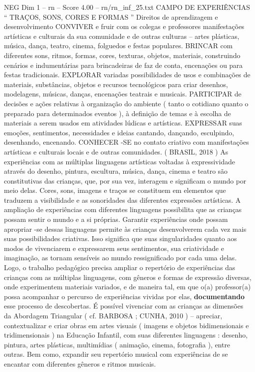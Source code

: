 \begin{textsample}{NEG Dim 1 – rn – Score 4.00 – rn/rn\_inf\_25.txt}  \label{ex:f1_neg_030}
CAMPO DE EXPERIÊNCIAS “ TRAÇOS, SONS, CORES E FORMAS ” Direitos de aprendizagem e desenvolvimento CONVIVER e fruir com os colegas e professores manifestações artísticas e culturais da sua comunidade e de outras culturas – artes plásticas, música, dança, teatro, cinema, folguedos e festas populares.
BRINCAR com diferentes sons, ritmos, formas, cores, texturas, objetos, materiais, construindo cenários e indumentárias para brincadeiras de faz de conta, encenações ou para festas tradicionais.
EXPLORAR variadas possibilidades de usos e combinações de materiais, substâncias, objetos e recursos tecnológicos para criar desenhos, modelagens, músicas, danças, encenações teatrais e musicais.
PARTICIPAR de decisões e ações relativas à organização do ambiente ( tanto o cotidiano quanto o preparado para determinados eventos ), à definição de temas e à escolha de materiais a serem usados em atividades lúdicas e artísticas.
EXPRESSAR suas emoções, sentimentos, necessidades e ideias cantando, dançando, esculpindo, desenhando, encenando.
CONHECER -SE no contato criativo com manifestações artísticas e culturais locais e de outras comunidades. ( BRASIL, 2018 ) As experiências com as múltiplas linguagens artísticas voltadas à expressividade através do desenho, pintura, escultura, música, dança, cinema e teatro são constitutivas das crianças, que, por sua vez, interagem e significam o mundo por meio delas.
Cores, sons, imagens e traços se constituem em elementos que traduzem a visibilidade e as sonoridades das diferentes expressões artísticas.
A ampliação de experiências com diferentes linguagens possibilita que as crianças possam sentir o mundo e a si próprias.
Garantir experiências onde possam apropriar -se dessas linguagens permite às crianças desenvolverem cada vez mais suas possibilidades criativas.
Isso significa que suas singularidades quanto aos modos de vivenciarem e expressarem seus sentimentos, sua criatividade e imaginação, as tornam sensíveis ao mundo ressignificado por cada uma delas.
Logo, o trabalho pedagógico precisa ampliar o repertório de experiências das crianças com as múltiplas linguagens, com gêneros e formas de expressão diversas, onde experimentem materiais variados, e de maneira tal, em que o(a) professor(a) possa acompanhar o percurso de experiências vividas por elas, \textbf{documentando} esse processo de descobertas.
É possível vivenciar com as crianças as dimensões da Abordagem Triangular ( cf.
BARBOSA ; CUNHA, 2010 ) – apreciar, contextualizar e criar obras em artes visuais ( imagens e objetos bidimensionais e tridimensionais ) na Educação Infantil, com suas diferentes linguagens : desenho, pintura, artes plásticas, multimídias ( animação, cinema, fotografia ), entre outras.
Bem como, expandir seu repertório musical com experiências de se encantar com diferentes gêneros e ritmos musicais.

\end{textsample}
